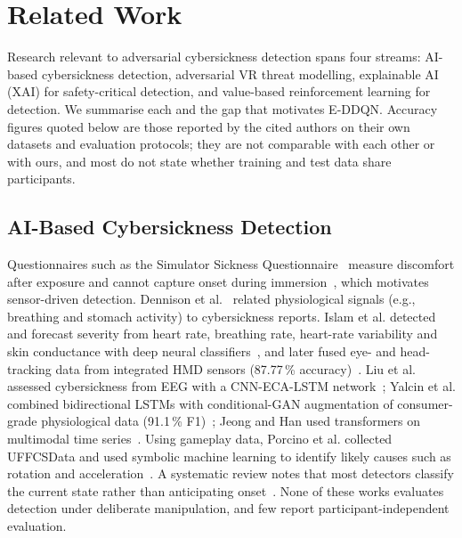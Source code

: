 \section{Related Work}
\label{sec:related}

Research relevant to adversarial cybersickness detection spans four streams: AI-based cybersickness detection, adversarial VR threat modelling, explainable AI (XAI) for safety-critical detection, and value-based reinforcement learning for detection. We summarise each and the gap that motivates E-DDQN. Accuracy figures quoted below are those reported by the cited authors on their own datasets and evaluation protocols; they are not comparable with each other or with ours, and most do not state whether training and test data share participants.

\subsection{AI-Based Cybersickness Detection}
Questionnaires such as the Simulator Sickness Questionnaire~\cite{kennedy1993ssq} measure discomfort after exposure and cannot capture onset during immersion~\cite{caserman2021cybersickness}, which motivates sensor-driven detection. Dennison et al.~\cite{dennison2016physio} related physiological signals (e.g., breathing and stomach activity) to cybersickness reports. Islam et al. detected and forecast severity from heart rate, breathing rate, heart-rate variability and skin conductance with deep neural classifiers~\cite{islam2020automatic}, and later fused eye- and head-tracking data from integrated HMD sensors (87.77\,\% accuracy)~\cite{islam2021fusion}. Liu et al. assessed cybersickness from EEG with a CNN-ECA-LSTM network~\cite{liu2024cnneca}; Yalcin et al. combined bidirectional LSTMs with conditional-GAN augmentation of consumer-grade physiological data (91.1\,\% F1)~\cite{yalcin2024automatic}; Jeong and Han used transformers on multimodal time series~\cite{jeong2024precyse}. Using gameplay data, Porcino et al. collected UFFCSData and used symbolic machine learning to identify likely causes such as rotation and acceleration~\cite{porcino2022identifying}. A systematic review notes that most detectors classify the current state rather than anticipating onset~\cite{yang2022mlreview}. None of these works evaluates detection under deliberate manipulation, and few report participant-independent evaluation.

